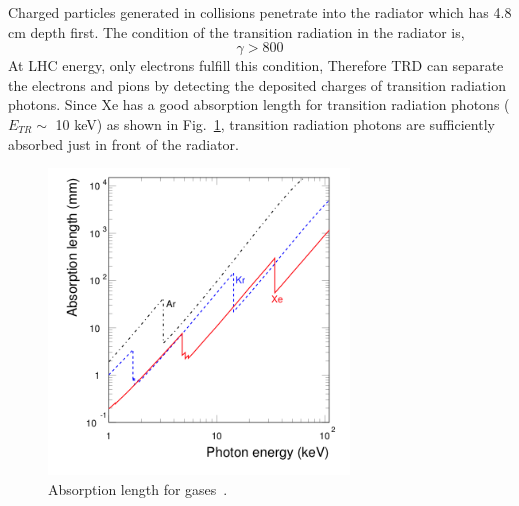 Charged particles generated in collisions penetrate into the radiator which has 4.8 cm depth first. 
The condition of the transition radiation in the radiator is, 
\begin{equation}
  \gamma > 800
\end{equation}
At LHC energy, only electrons fulfill this condition, 
Therefore TRD can separate the electrons and pions by detecting the deposited charges of transition radiation photons.
Since Xe has a good absorption length for transition radiation photons ($E_{TR}\sim$ 10 keV) as shown in Fig.~\ref{fig_3_xe}, transition radiation photons are sufficiently absorbed just in front of the radiator. 
\begin{figure}[!h]
  \centering
  \includegraphics[width=8cm]{chap3/figure/TRD/AbsorptionLength.png}
  \caption{Absorption length for gases~\cite{bib_trdtdr}.}
  \label{fig_3_xe}
\end{figure}

